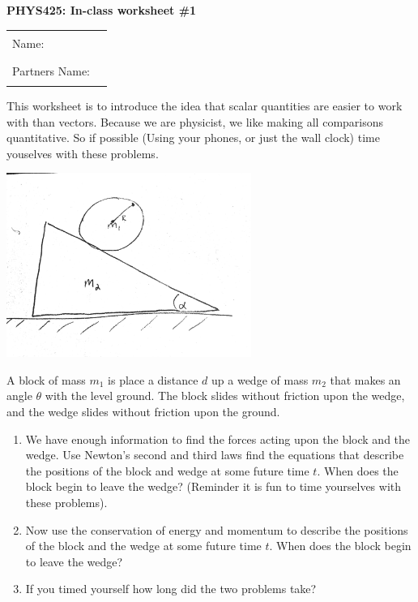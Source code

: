 \documentclass[10pt]{article}
\begin{document}
\thispagestyle{empty}
\makebox{\hspace{1cm}}
\vspace{-0.5in}
\begin{center}

{\Large \bf PHYS425: In-class worksheet \#1} \\
\end{center}


\vspace{0.5cm}
\begin{tabular}{ll}
Name: & \quad \rule{5in}{0.4pt} \\[0.3cm]
Partners Name: &  \quad \rule{5in}{0.4pt} 
\end{tabular}
\vspace{0.5cm}

\vspace{0.5cm}
This worksheet is to introduce the idea that scalar quantities are easier to work with than vectors. Because we are physicist, we like making all comparisons quantitative. So if possible (Using your phones, or just the wall clock) time youselves with these problems.

\begin{center}
\includegraphics[width=0.6\textwidth]{fig.pdf}
\end{center}

A block of mass $m_1$ is place a distance $d$ up a wedge of mass $m_2$ that makes an angle $\theta$ with the level ground. The block slides without friction upon the wedge, and the wedge slides without friction upon the ground.

\begin{enumerate}
\item We have enough information to find the forces acting upon the block and the wedge. Use Newton's second and third laws find the equations that describe the positions of the block and wedge at some future time $t$. When does the block begin to leave the wedge? (Reminder it is fun to time yourselves with these problems).

\newpage

\item Now use the conservation of energy and momentum to describe the positions of the block and the wedge at some future time $t$. When does the block begin to leave the wedge?

\vspace{7in}

\item If you timed yourself how long did the two problems take?

\end{enumerate}
\end{document}
